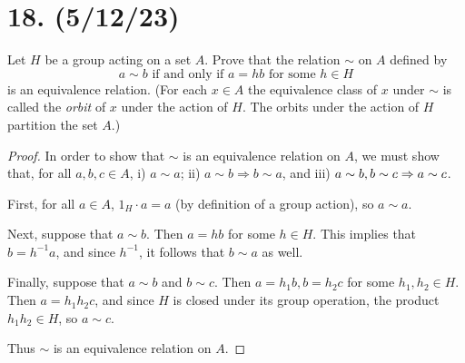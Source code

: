 \documentclass{article}
\begin{document}
\section*{18. (5/12/23)}

Let $H$ be a group acting on a set $A$. Prove that the relation $\sim$ on $A$ defined by
\begin{equation*}
  a \sim b \text{ if and only if } a = hb \text{ for some } h \in H
\end{equation*}
is an equivalence relation. (For each $x \in A$ the equivalence class of $x$ under $\sim$ is called the \emph{orbit} of $x$ under the action of $H$. The orbits under the action of $H$ partition the set $A$.)

\begin{proof}
  In order to show that $\sim$ is an equivalence relation on $A$, we must show that, for all $a, b, c \in A$, i) $a \sim a$; ii) $a \sim b \Rightarrow b \sim a$, and iii) $a \sim b, b \sim c \Rightarrow \\ a \sim c$.

  First, for all $a \in A$, $1_H \cdot a = a$ (by definition of a group action), so $a \sim a$.

  Next, suppose that $a \sim b$. Then $a = hb$ for some $h \in H$. This implies that $b = h^{-1} a$, and since $h^{-1}$, it follows that $b \sim a$ as well.

  Finally, suppose that $a \sim b$ and $b \sim c$. Then $a = h_1 b, b = h_2 c$ for some $h_1, h_2 \in H$. Then $a = h_1 h_2 c$, and since $H$ is closed under its group operation, the product $h_1 h_2 \in H$, so $a \sim c$.

  Thus $\sim$ is an equivalence relation on $A$.
\end{proof}
\end{document}
